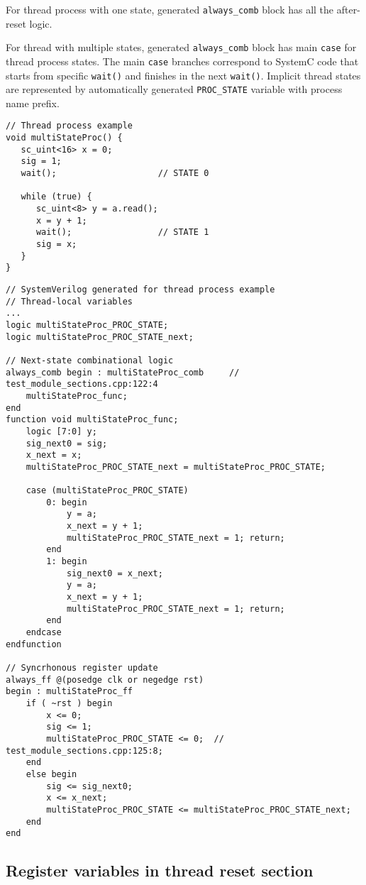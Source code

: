For thread process with one state, generated {\tt always\_comb} block has all the after-reset logic.

For thread with multiple states, generated {\tt always\_comb} block has main {\tt case} for thread process states. The main {\tt case} branches correspond to SystemC code that starts from specific {\tt wait()} and finishes in the next {\tt wait()}. Implicit thread states are represented by automatically generated {\tt PROC\_STATE} variable with process name prefix. 

\begin{lstlisting}[style=mycpp]
// Thread process example
void multiStateProc() {
   sc_uint<16> x = 0;
   sig = 1;              
   wait();                    // STATE 0

   while (true) {
      sc_uint<8> y = a.read(); 
      x = y + 1;
      wait();                 // STATE 1
      sig = x;           
   }
}
\end{lstlisting}

\begin{lstlisting}[style=myverilog]
// SystemVerilog generated for thread process example
// Thread-local variables
...
logic multiStateProc_PROC_STATE;
logic multiStateProc_PROC_STATE_next;

// Next-state combinational logic
always_comb begin : multiStateProc_comb     // test_module_sections.cpp:122:4
    multiStateProc_func;
end
function void multiStateProc_func;
    logic [7:0] y;
    sig_next0 = sig;
    x_next = x;
    multiStateProc_PROC_STATE_next = multiStateProc_PROC_STATE;
    
    case (multiStateProc_PROC_STATE)
        0: begin
            y = a;
            x_next = y + 1;
            multiStateProc_PROC_STATE_next = 1; return;  
        end
        1: begin
            sig_next0 = x_next;
            y = a;
            x_next = y + 1;
            multiStateProc_PROC_STATE_next = 1; return; 
        end
    endcase
endfunction

// Syncrhonous register update
always_ff @(posedge clk or negedge rst) 
begin : multiStateProc_ff
    if ( ~rst ) begin
        x <= 0;
        sig <= 1;
        multiStateProc_PROC_STATE <= 0;  // test_module_sections.cpp:125:8;
    end
    else begin
        sig <= sig_next0;
        x <= x_next;
        multiStateProc_PROC_STATE <= multiStateProc_PROC_STATE_next;
    end
end
\end{lstlisting}

\subsection{Register variables in thread reset section}\label{section:reg_in_reset}

